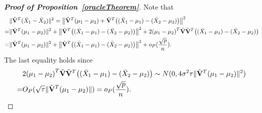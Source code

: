 \documentclass[review]{elsarticle}
\theoremstyle{plain}
\theoremstyle{definition}
\theoremstyle{remark}
\begin{document}
\begin{proof}[\textbf{Proof of Proposition~\ref{oracleTheorem}}]
Note that
    \begin{equation}\label{qiguaile}
        \begin{aligned}
            &\|\tilde{\mathbf{V}}^T(\bar{X}_1-\bar{X}_2)\|^2
            =\big\|\tilde{\mathbf{V}}^T(\mu_1-\mu_2)+\tilde{\mathbf{V}}^T\big((\bar{X}_1-\mu_1)-(\bar{X}_2-\mu_2)\big)\big\|^2\\
            =&\|\tilde{\mathbf{V}}^T(\mu_1-\mu_2)\|^2+
            \big\|\tilde{\mathbf{V}}^T\big((\bar{X}_1-\mu_1)-(\bar{X}_2-\mu_2)\big)\big\|^2+
            2{(\mu_1-\mu_2)}^T\tilde{\mathbf{V}}\tilde{\mathbf{V}}^T\big((\bar{X}_1-\mu_1)-(\bar{X}_2-\mu_2)\big)\\
            =&\|\tilde{\mathbf{V}}^T(\mu_1-\mu_2)\|^2+
            \big\|\tilde{\mathbf{V}}^T\big((\bar{X}_1-\mu_1)-(\bar{X}_2-\mu_2)\big)\big\|^2+
            o_P(\frac{\sqrt{p}}{n}).
        \end{aligned}
    \end{equation}
    The last equality holds since
    \begin{equation*}
        \begin{aligned}
            &2{(\mu_1-\mu_2)}^T\tilde{\mathbf{V}}\tilde{\mathbf{V}}^T\big((\bar{X}_1-\mu_1)-(\bar{X}_2-\mu_2)\big)\sim N(0,4\sigma^2 \tau \|\tilde{\mathbf{V}}^T(\mu_1-\mu_2)\|^2)\\
            =& O_P(\sqrt{\tau}\|\tilde{\mathbf{V}}^T(\mu_1-\mu_2)\| )=o_P(\frac{\sqrt{p}}{n}).
        \end{aligned}
    \end{equation*}


\end{proof}
\end{document}
